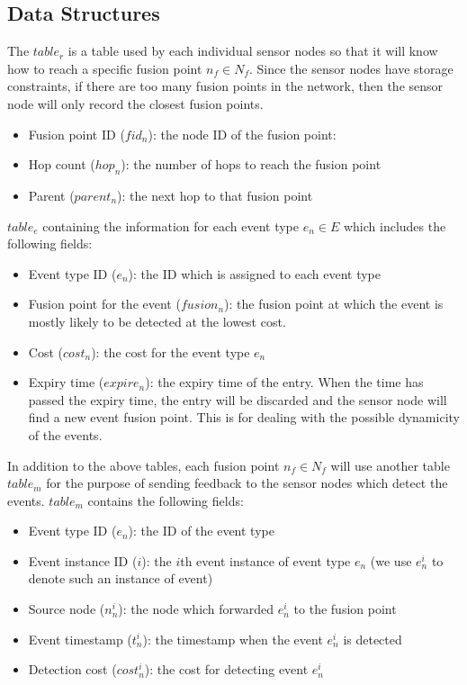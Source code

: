 \subsection{Data Structures}
The \(table_r\) is a table used by each individual sensor nodes so that it will know how to reach a specific fusion point \(n_f\in N_f\). Since the sensor nodes have storage constraints, if there are too many fusion points in the network, then the sensor node will only record the closest fusion points.
\begin{itemize}
\item Fusion point ID (\(fid_n\)): the node ID of the fusion point:
\item	Hop count (\(hop_n\)): the number of hops to reach the fusion point
\item	Parent (\(parent_n\)): the next hop to that fusion point
\end{itemize}
\(table_e\) containing the information for each event type \(e_n\in E\) which includes the following fields:
\begin{itemize}
\item Event type ID (\(e_n\)): the ID which is assigned to each event type
\item Fusion point for the event (\(fusion_n\)): the fusion point at which the event is mostly likely to be detected at the lowest cost.
\item Cost (\(cost_n\)): the cost for the event type \(e_n\)
\item Expiry time (\(expire_n\)): the expiry time of the entry. When the time has passed the expiry time, the entry will be discarded and the sensor node will find a new event fusion point. This is for dealing with the possible dynamicity of the events.
\end{itemize}
In addition to the above tables, each fusion point \(n_f\in N_f\) will use another table \(table_m\) for the purpose of sending feedback to the sensor nodes which detect the events. \(table_m\) contains the following fields:
\begin{itemize}
\item Event type ID (\(e_n\)): the ID of the event type
\item Event instance ID (\(i\)): the \(i\)th event instance of event type \(e_n\) (we use \(e_n^i\) to denote such an instance of event)
\item Source node (\(n_n^i\)): the node which forwarded \(e_n^i\) to the fusion point
\item Event timestamp (\(t_n^i\)): the timestamp when the event \(e_n^i\) is detected
\item Detection cost (\(cost_n^i\)): the cost for detecting event \(e_n^i\)
\end{itemize}

